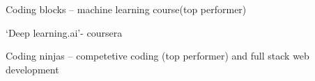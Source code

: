 
\begin{cventries}
  \cventry
    {} %
    {} %
    {} %
    {} %
    {
      \begin{cvitems} %
        \item {Coding blocks – machine learning course(top performer)}
        \item {‘Deep learning.ai’- coursera }
        \item {Coding ninjas – competetive coding (top performer) and full stack web development}
      \end{cvitems}
    }
\end{cventries}